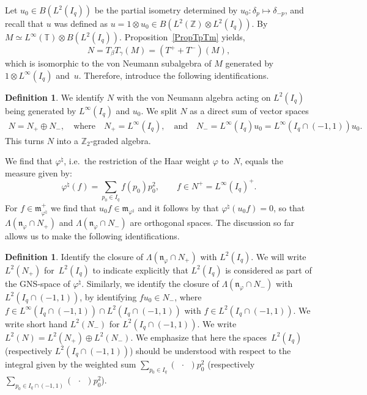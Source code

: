 \documentclass[pdftex]{sigma}
\numberwithin{equation}{section}
\theoremstyle{definition}
\newtheorem{dfn}[thm]{Definition}
\newcommand{\nphi}{\mathfrak{n}_\varphi}
\begin{document}
Let $u_0\in B( L^2(I_q)) $ be the partial isometry determined by $u_0: \delta_p \mapsto \delta_{-p}$, and recall that $u$ was def\/ined as $u = 1 \otimes u_0 \in B( L^2(\mathbb{Z}) \otimes L^2(I_q))$.
By \cite[Lemma~2.4]{KoeKus} $M \simeq L^\infty(\mathbb{T}) \otimes B(L^2(I_q))$. Proposition~\ref{PropTpTm} yields,
\[
N = T_\beta T_\gamma (M) = (T^+ + T^-)(M),
\]
which is isomorphic to the von Neumann subalgebra of $M$ generated by $1 \otimes L^\infty(I_q)$ and~$u$. Therefore, introduce the following identif\/ications.

\begin{dfn}
We identify $N$ with the von Neumann algebra acting on $L^2(I_q)$ being generated by $L^\infty(I_q)$ and $u_0$.
 We split $N$ as a direct sum of vector spaces
\begin{gather*}
N = N_+ \oplus N_-,\quad \textrm{where} \quad N_+ = L^\infty(I_q), \quad \textrm{and}\quad  N_- =  L^\infty(I_q)u_0 =  L^\infty(I_q \cap (-1,1))u_0.
\end{gather*}
This turns $N$ into a $\mathbb{Z}_2$-graded algebra.
\end{dfn}


  We f\/ind that $\varphi^\natural$, i.e.\ the restriction of the Haar weight $\varphi$ \cite[Def\/inition~4.1]{KoeKus} to~$N$, equals the measure given by:
\[
\varphi^\natural(f) = \sum_{p_0 \in I_q} f(p_0) p_0^2, \qquad f \in N^+ = L^\infty(I_q)^+.
\]
For $f \in \mathfrak{m}_{\varphi^\natural}^+$ we f\/ind that $u_0f \in \mathfrak{m}_{\varphi^\natural}$ and it follows by \cite[Def\/inition~4.1]{KoeKus} that $\varphi^\natural(u_0 f) = 0$, so that $\Lambda(\nphi \cap N_+)$ and $\Lambda(\nphi \cap N_-)$  are orthogonal spaces. The discussion so far allows us to make the following identif\/ications.

\begin{dfn}
Identify the closure of $\Lambda(\nphi \cap N_+)$ with $L^2(I_q)$. We will write $L^2(N_+)$ for~$L^2(I_q)$ to indicate explicitly that $L^2(I_q)$ is considered as part of the GNS-space of $\varphi^\natural$.
 Similarly, we identify the closure of $\Lambda(\nphi \cap N_-)$ with $L^2(I_q \cap (-1,1))$, by identifying $f u_0 \in N_-$, where  $f \in  L^\infty(I_q \cap (-1,1)) \cap L^2(I_q \cap (-1,1))$ with $f \in L^2(I_q \cap (-1,1))$.  We write short hand $L^2(N_-)$ for  $L^2(I_q \cap (-1,1))$. We write $L^2(N) = L^2(N_+) \oplus L^2(N_-)$. We emphasize that here the spaces~$L^2(I_q)$ (respectively  $L^2(I_q \cap (-1,1))$) should be understood with respect to the integral given by the weighted sum $\sum_{p_0 \in I_q }( \:\: \cdot \:\: )   p_0^2$ (respectively $\sum_{p_0 \in I_q \cap (-1,1)}( \:\: \cdot \:\: )   p_0^2$).
\end{dfn}
\end{document}
